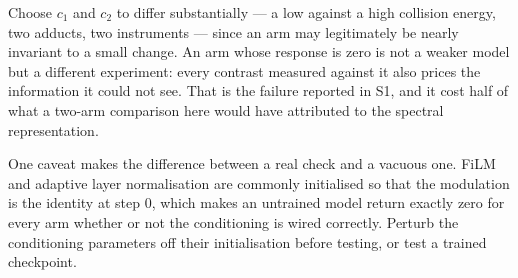\documentclass[11pt]{article}
\begin{document}
Choose $c_1$ and $c_2$ to differ substantially --- a low against a high collision
energy, two adducts, two instruments --- since an arm may legitimately be nearly
invariant to a small change. An arm whose response is zero is not a weaker model
but a different experiment: every contrast measured against it also prices the
information it could not see. That is the failure reported in S1, and it cost half
of what a two-arm comparison here would have attributed to the spectral
representation.

One caveat makes the difference between a real check and a vacuous one. FiLM and
adaptive layer normalisation are commonly initialised so that the modulation is
the identity at step 0, which makes an untrained model return exactly zero for
every arm whether or not the conditioning is wired correctly. Perturb the
conditioning parameters off their initialisation before testing, or test a trained
checkpoint.
\end{document}
